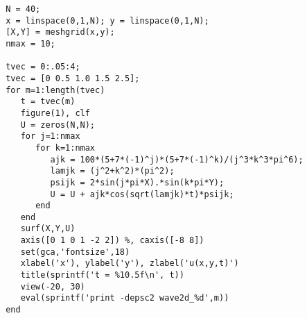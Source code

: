 {\footnotesize
\begin{verbatim}
 N = 40;
 x = linspace(0,1,N); y = linspace(0,1,N);
 [X,Y] = meshgrid(x,y);
 nmax = 10;

 tvec = 0:.05:4;
 tvec = [0 0.5 1.0 1.5 2.5];
 for m=1:length(tvec)
    t = tvec(m)
    figure(1), clf
    U = zeros(N,N);
    for j=1:nmax
       for k=1:nmax 
          ajk = 100*(5+7*(-1)^j)*(5+7*(-1)^k)/(j^3*k^3*pi^6);
          lamjk = (j^2+k^2)*(pi^2);
          psijk = 2*sin(j*pi*X).*sin(k*pi*Y);
          U = U + ajk*cos(sqrt(lamjk)*t)*psijk;
       end
    end
    surf(X,Y,U)
    axis([0 1 0 1 -2 2]) %, caxis([-8 8])
    set(gca,'fontsize',18)
    xlabel('x'), ylabel('y'), zlabel('u(x,y,t)')
    title(sprintf('t = %10.5f\n', t))
    view(-20, 30)
    eval(sprintf('print -depsc2 wave2d_%d',m))
 end
\end{verbatim}}
